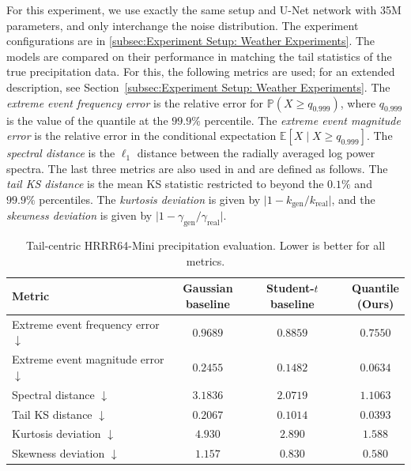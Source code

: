 \documentclass{article}
\theoremstyle{plain}
\theoremstyle{definition}
\theoremstyle{remark}
\begin{document}
For this experiment, we use exactly the same setup and U-Net network with 35M parameters, and only interchange the noise distribution. The experiment configurations are in \ref{subsec:Experiment Setup: Weather Experiments}. The models are compared on their performance in matching the tail statistics of the true precipitation data. For this, the following metrics are used; for an extended description, see Section~\ref{subsec:Experiment Setup: Weather Experiments}. The \textit{extreme event frequency error} is the relative error for $\mathbb{P}(X \ge q_{0.999})$, where $q_{0.999}$ is the value of the quantile at the $99.9\%$ percentile. The \textit{extreme event magnitude error} is the relative error in the conditional expectation $\mathbb{E}[X \mid X \ge q_{0.999}]$. The \textit{spectral distance} is the $\ell_1$ distance between the radially averaged log power spectra. The last three metrics are also used in \cite{pandey2024heavytaileddiffusionmodels} and are defined as follows. The \textit{tail KS distance} is the mean KS statistic restricted to beyond the $0.1\%$ and $99.9\%$ percentiles. The \textit{kurtosis deviation} is given by $\lvert 1 - k_\text{gen}/k_\text{real} \rvert$, and the \textit{skewness deviation} is given by $\lvert 1 - \gamma_\text{gen}/\gamma_\text{real} \rvert$.
\begin{table}[h]
\centering
\scriptsize
\setlength{\tabcolsep}{4pt}
\renewcommand{\arraystretch}{1.12}
\begin{tabular}{p{}ccc}
\toprule
Metric 
& \makecell{Gaussian\\baseline}
& \makecell{Student-$t$\\baseline}
& \makecell{Quantile\\(Ours)} \\
\midrule
Extreme event frequency error $\downarrow$
& $0.9689$
& $0.8859$
& $\mathbf{0.7550}$ \\

Extreme event magnitude error $\downarrow$
& $0.2455$
& $0.1482$
& $\mathbf{0.0634}$ \\

Spectral distance $\downarrow$
& $3.1836$
& $2.0719$
& $\mathbf{1.1063}$ \\

Tail KS distance $\downarrow$
& $0.2067$
& $0.1014$
& $\mathbf{0.0393}$ \\

Kurtosis deviation $\downarrow$
& $4.930$
& $2.890$
& $\mathbf{1.588}$ \\

Skewness deviation $\downarrow$
& $1.157$
& $0.830$
& $\mathbf{0.580}$ \\
\bottomrule
\end{tabular}
\vspace{2pt}
\caption{Tail-centric HRRR64-Mini precipitation evaluation. Lower is better for all metrics.}
\label{tab:hrrr_tail_metrics}
\vspace{-0.5em}
\end{table}
\end{document}
